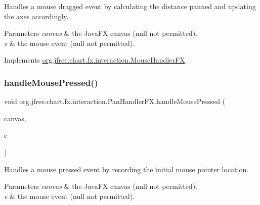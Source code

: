 Handles a mouse dragged event by calculating the distance panned and updating the axes accordingly.


\begin{DoxyParams}{Parameters}
{\em canvas} & the Java\+FX canvas ({\ttfamily null} not permitted). \\
\hline
{\em e} & the mouse event ({\ttfamily null} not permitted). \\
\hline
\end{DoxyParams}


Implements \mbox{\hyperlink{interfaceorg_1_1jfree_1_1chart_1_1fx_1_1interaction_1_1_mouse_handler_f_x_a06bbfd28b778bca8ef8caf90174e18f4}{org.\+jfree.\+chart.\+fx.\+interaction.\+Mouse\+Handler\+FX}}.

\mbox{\label{classorg_1_1jfree_1_1chart_1_1fx_1_1interaction_1_1_pan_handler_f_x_a216c7c8b3d280c17f29bf8d55188644b}} 
\subsubsection{\texorpdfstring{handle\+Mouse\+Pressed()}{handleMousePressed()}}
{\footnotesize\ttfamily void org.\+jfree.\+chart.\+fx.\+interaction.\+Pan\+Handler\+F\+X.\+handle\+Mouse\+Pressed (\begin{DoxyParamCaption}\item[{\mbox{\hyperlink{classorg_1_1jfree_1_1chart_1_1fx_1_1_chart_canvas}{Chart\+Canvas}}}]{canvas,  }\item[{Mouse\+Event}]{e }\end{DoxyParamCaption})}

Handles a mouse pressed event by recording the initial mouse pointer location.


\begin{DoxyParams}{Parameters}
{\em canvas} & the Java\+FX canvas ({\ttfamily null} not permitted). \\
\hline
{\em e} & the mouse event ({\ttfamily null} not permitted). \\
\hline
\end{DoxyParams}


